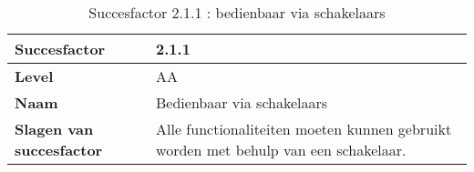 \begin{table}[H]
    \centering
    \caption{Succesfactor 2.1.1 : bedienbaar via schakelaars}
    \hspace*{-1cm}\begin{tabular}{|l|p{12cm}|} 
        \hline
        \textbf{Succesfactor}                 & 2.1.1                                                                                                                                                                                                                                                                                                                                                                                                                                                                                                             \\ 
        \hline
        \textbf{Level}                        & AA                                                                                                                                                                                                                                                                                                                                                                                                                                                                                                                 \\ 
        \hline
        \textbf{Naam}                         & Bedienbaar via schakelaars~                                                                                                                                                                                                                                                                                                                                                                                                                                                                                      \\ 
        \hline
        \textbf{Slagen van succesfactor}      & Alle functionaliteiten moeten kunnen gebruikt worden met behulp van een schakelaar.                                                                                                                                                                                                                                                                                                                                                          \\ 

\end{tabular}
\end{table}
